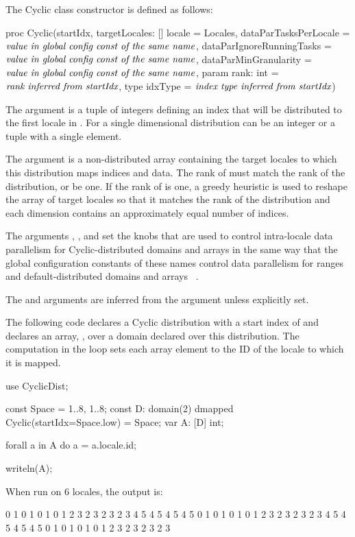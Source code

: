 The Cyclic class constructor is defined as follows:
\begin{chapel}
proc Cyclic(startIdx,
           targetLocales: [] locale = Locales,
           dataParTasksPerLocale = $\mbox{{\it value in global config const of the same name}}$,
           dataParIgnoreRunningTasks = $\mbox{{\it value in global config const of the same name}}$,
           dataParMinGranularity = $\mbox{{\it value in global config const of the same name}}$,
           param rank: int = $\mbox{{\it rank inferred from startIdx}}$,
           type idxType = $\mbox{{\it index type inferred from startIdx}}$)
\end{chapel}

The argument  is a tuple of integers defining an index that
will be distributed to the first locale in . For a single
dimensional distribution  can be an integer or a tuple with a
single element.

The argument  is a non-distributed array
containing the target locales to which this distribution maps indices
and data.  The rank of  must match the rank of the
distribution, or be one.  If the rank of
 is one, a greedy heuristic is used to reshape the
array of target locales so that it matches the rank of the
distribution and each dimension contains an approximately equal number
of indices.

The
arguments , ,
and  set the knobs that are used to
control intra-locale data parallelism for Cyclic-distributed domains
and arrays in the same way that the global configuration constants of
these names control data parallelism for ranges and
default-distributed domains and arrays ~.

The  and  arguments are inferred from the
 argument unless explicitly set.

\begin{example}
The following code declares a Cyclic distribution with a start index
of  and declares an array, , over a domain
declared over this distribution.  The computation in the 
loop sets each array element to the ID of the locale to which it is
mapped.
\begin{chapel}
use CyclicDist;

const Space = {1..8, 1..8};
const D: domain(2) dmapped Cyclic(startIdx=Space.low) = Space;
var A: [D] int;

forall a in A do
  a = a.locale.id;

writeln(A);
\end{chapel}
When run on 6 locales, the output is:
\begin{chapelprintoutput}{}
0 1 0 1 0 1 0 1
2 3 2 3 2 3 2 3
4 5 4 5 4 5 4 5
0 1 0 1 0 1 0 1
2 3 2 3 2 3 2 3
4 5 4 5 4 5 4 5
0 1 0 1 0 1 0 1
2 3 2 3 2 3 2 3
\end{chapelprintoutput}
\end{example}


